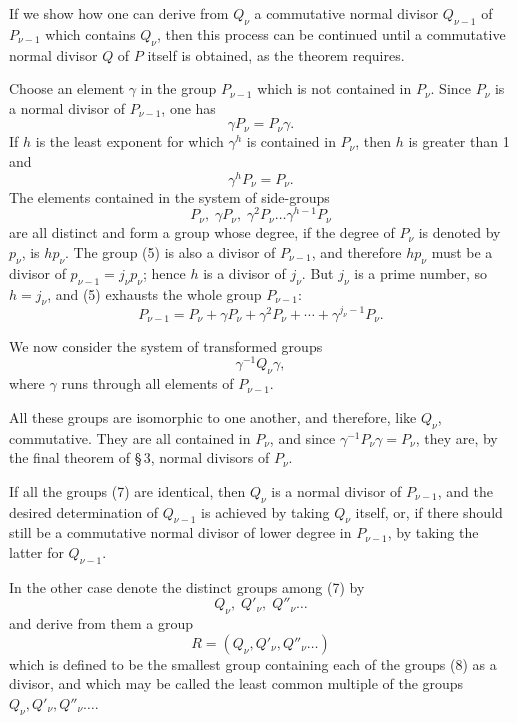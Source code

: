 \documentclass[11pt]{article}
\begin{document}
If we show how one can derive from $Q_\nu$ a commutative normal divisor $Q_{\nu-1}$ of $P_{\nu-1}$ which contains $Q_\nu$, then this process can be continued until a commutative normal divisor $Q$ of $P$ itself is obtained, as the theorem requires.

Choose an element $\gamma$ in the group $P_{\nu-1}$ which is not contained in $P_\nu$. Since $P_\nu$ is a normal divisor of $P_{\nu-1}$, one has
\begin{equation}
\gamma P_\nu=P_\nu\gamma.
\tag{3}
\end{equation}
If $h$ is the least exponent for which $\gamma^h$ is contained in $P_\nu$, then $h$ is greater than 1 and
\begin{equation}
\gamma^hP_\nu=P_\nu.
\tag{4}
\end{equation}
The elements contained in the system of side-groups
\begin{equation}
P_\nu,\;\gamma P_\nu,\;\gamma^2P_\nu\ldots \gamma^{h-1}P_\nu
\tag{5}
\end{equation}
are all distinct and form a group whose degree, if the degree of $P_\nu$ is denoted by $p_\nu$, is $hp_\nu$. The group (5) is also a divisor of $P_{\nu-1}$, and therefore $hp_\nu$ must be a divisor of $p_{\nu-1}=j_\nu p_\nu$; hence $h$ is a divisor of $j_\nu$. But $j_\nu$ is a prime number, so $h=j_\nu$, and (5) exhausts the whole group $P_{\nu-1}$:
\begin{equation}
P_{\nu-1}=P_\nu+\gamma P_\nu+\gamma^2P_\nu+\cdots+\gamma^{j_\nu-1}P_\nu.
\tag{6}
\end{equation}

We now consider the system of transformed groups
\begin{equation}
\gamma^{-1}Q_\nu\gamma,
\tag{7}
\end{equation}
where $\gamma$ runs through all elements of $P_{\nu-1}$.

All these groups are isomorphic to one another, and therefore, like $Q_\nu$, commutative. They are all contained in $P_\nu$, and since $\gamma^{-1}P_\nu\gamma=P_\nu$, they are, by the final theorem of \S\,3, normal divisors of $P_\nu$.

If all the groups (7) are identical, then $Q_\nu$ is a normal divisor of $P_{\nu-1}$, and the desired determination of $Q_{\nu-1}$ is achieved by taking $Q_\nu$ itself, or, if there should still be a commutative normal divisor of lower degree in $P_{\nu-1}$, by taking the latter for $Q_{\nu-1}$.

In the other case denote the distinct groups among (7) by
\begin{equation}
Q_\nu,\;Q'_\nu,\;Q''_\nu\ldots
\tag{8}
\end{equation}
and derive from them a group
\begin{equation}
R=(Q_\nu,Q'_\nu,Q''_\nu\ldots)
\tag{9}
\end{equation}
which is defined to be the smallest group containing each of the groups (8) as a divisor, and which may be called the least common multiple of the groups $Q_\nu,Q'_\nu,Q''_\nu\ldots$.
\end{document}
